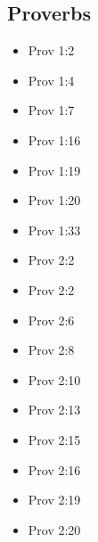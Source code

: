 \documentclass[14pt]{book}
\begin{document}
						\subsection{Proverbs}
						\begin{multicols}{2}\begin{itemize}

									\item Prov 1:2
									
									\item Prov 1:4
									
									\item Prov 1:7
									
									\item Prov 1:16
									
									\item Prov 1:19
									
									\item Prov 1:20
									
									\item Prov 1:33
									
									\item Prov 2:2
									
									\item Prov 2:2
									
									\item Prov 2:6
									
									\item Prov 2:8
									
									\item Prov 2:10
									
									\item Prov 2:13
									
									\item Prov 2:15
									
									\item Prov 2:16
									
									\item Prov 2:19
									
									\item Prov 2:20
									

\end{itemize}
\end{multicols}
\end{document}
